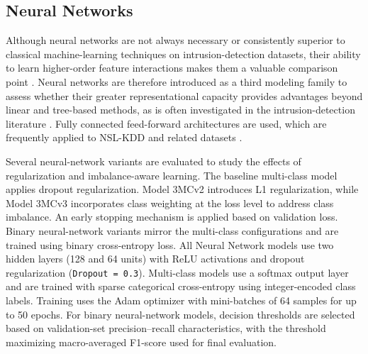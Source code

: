 \pagebreak
\subsection{Neural Networks}
Although neural networks are not always necessary or consistently superior to classical machine-learning techniques on intrusion-detection datasets, 
their ability to learn higher-order feature interactions makes them a valuable comparison point \cite{ali2025deep, rawat2019intrusion}. Neural networks are therefore 
introduced as a third modeling family to assess whether their greater representational capacity provides advantages beyond linear and tree-based methods, as is often 
investigated in the intrusion-detection literature \cite{abrar2020machine, ali2025deep, rawat2019intrusion}. Fully connected feed-forward architectures are used, which 
are frequently applied to NSL-KDD and related datasets \cite{abrar2020machine, hong2021machine, ali2025deep}.



Several neural-network variants are evaluated to study the effects of regularization and imbalance-aware learning. The baseline multi-class model applies dropout regularization. 
Model 3MCv2 introduces L1 regularization, while Model 3MCv3 incorporates class weighting at the loss level to address class imbalance. An early stopping mechanism is applied based 
on validation loss. Binary neural-network variants mirror the multi-class configurations and are trained using binary cross-entropy loss. All Neural Network models use two hidden 
layers (128 and 64 units) with ReLU activations and dropout regularization (\texttt{Dropout = 0.3}). Multi-class models use a softmax output layer and are trained with sparse 
categorical cross-entropy using integer-encoded class labels. Training uses the Adam optimizer with mini-batches of 64 samples for up to 50 epochs. For binary neural-network models, 
decision thresholds are selected based on validation-set precision–recall characteristics, with the threshold maximizing macro-averaged F1-score used for final evaluation.